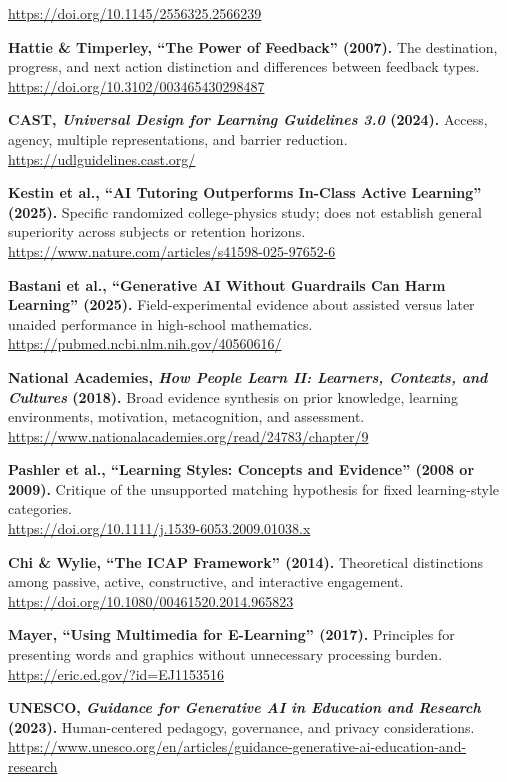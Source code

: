 \begin{enumerate}[label={[\textbf{S\arabic*}]}, leftmargin=2em, itemsep=0.6em]
    \url{https://doi.org/10.1145/2556325.2566239}
    \item \textbf{Hattie \& Timperley, ``The Power of Feedback'' (2007).} The destination, progress, and next action distinction and differences between feedback types. \\
    \url{https://doi.org/10.3102/003465430298487}
    \item \textbf{CAST, \emph{Universal Design for Learning Guidelines 3.0} (2024).} Access, agency, multiple representations, and barrier reduction. \\
    \url{https://udlguidelines.cast.org/}
    \item \textbf{Kestin et al., ``AI Tutoring Outperforms In-Class Active Learning'' (2025).} Specific randomized college-physics study; does not establish general superiority across subjects or retention horizons. \\
    \url{https://www.nature.com/articles/s41598-025-97652-6}
    \item \textbf{Bastani et al., ``Generative AI Without Guardrails Can Harm Learning'' (2025).} Field-experimental evidence about assisted versus later unaided performance in high-school mathematics. \\
    \url{https://pubmed.ncbi.nlm.nih.gov/40560616/}
    \item \textbf{National Academies, \emph{How People Learn II: Learners, Contexts, and Cultures} (2018).} Broad evidence synthesis on prior knowledge, learning environments, motivation, metacognition, and assessment. \\
    \url{https://www.nationalacademies.org/read/24783/chapter/9}
    \item \textbf{Pashler et al., ``Learning Styles: Concepts and Evidence'' (2008 or 2009).} Critique of the unsupported matching hypothesis for fixed learning-style categories. \\
    \url{https://doi.org/10.1111/j.1539-6053.2009.01038.x}
    \item \textbf{Chi \& Wylie, ``The ICAP Framework'' (2014).} Theoretical distinctions among passive, active, constructive, and interactive engagement. \\
    \url{https://doi.org/10.1080/00461520.2014.965823}
    \item \textbf{Mayer, ``Using Multimedia for E-Learning'' (2017).} Principles for presenting words and graphics without unnecessary processing burden. \\
    \url{https://eric.ed.gov/?id=EJ1153516}
    \item \textbf{UNESCO, \emph{Guidance for Generative AI in Education and Research} (2023).} Human-centered pedagogy, governance, and privacy considerations. \\
    \url{https://www.unesco.org/en/articles/guidance-generative-ai-education-and-research}
\end{enumerate}


